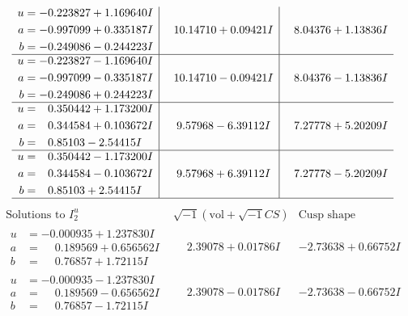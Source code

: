 \documentclass[1p]{elsarticle_modified}
\theoremstyle{definition}
\newcommand{\I}{\sqrt{-1}}
\begin{document}
$$\begin{array}{c|c|c}
\begin{aligned}
u &= -0.223827 + 1.169640 I \\
a &= -0.997099 + 0.335187 I \\
b &= -0.249086 - 0.244223 I\end{aligned}
 & \phantom{-}10.14710 + 0.09421 I & \phantom{-}8.04376 + 1.13836 I \\ \hline\begin{aligned}
u &= -0.223827 - 1.169640 I \\
a &= -0.997099 - 0.335187 I \\
b &= -0.249086 + 0.244223 I\end{aligned}
 & \phantom{-}10.14710 - 0.09421 I & \phantom{-}8.04376 - 1.13836 I \\ \hline\begin{aligned}
u &= \phantom{-}0.350442 + 1.173200 I \\
a &= \phantom{-}0.344584 + 0.103672 I \\
b &= \phantom{-}0.85103 - 2.54415 I\end{aligned}
 & \phantom{-}9.57968 - 6.39112 I & \phantom{-}7.27778 + 5.20209 I \\ \hline\begin{aligned}
u &= \phantom{-}0.350442 - 1.173200 I \\
a &= \phantom{-}0.344584 - 0.103672 I \\
b &= \phantom{-}0.85103 + 2.54415 I\end{aligned}
 & \phantom{-}9.57968 + 6.39112 I & \phantom{-}7.27778 - 5.20209 I\\
 \hline 
 \end{array}$$\newpage$$\begin{array}{c|c|c}  
\text{Solutions to }I^u_{2}& \I (\text{vol} + \sqrt{-1}CS) & \text{Cusp shape}\\
 \hline 
\begin{aligned}
u &= -0.000935 + 1.237830 I \\
a &= \phantom{-}0.189569 + 0.656562 I \\
b &= \phantom{-}0.76857 + 1.72115 I\end{aligned}
 & \phantom{-}2.39078 + 0.01786 I & -2.73638 + 0.66752 I \\ \hline\begin{aligned}
u &= -0.000935 - 1.237830 I \\
a &= \phantom{-}0.189569 - 0.656562 I \\
b &= \phantom{-}0.76857 - 1.72115 I\end{aligned}
 & \phantom{-}2.39078 - 0.01786 I & -2.73638 - 0.66752 I \\ \hline\begin{aligned}

\end{aligned}
\end{array}$$
\end{document}
